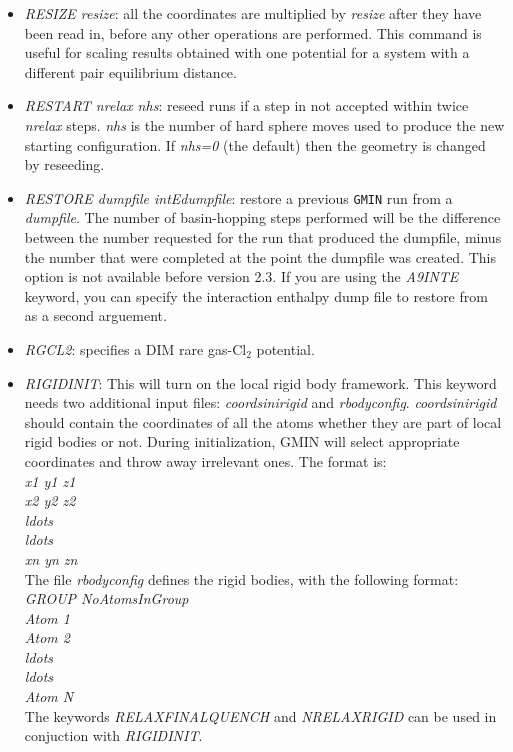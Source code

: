 \documentclass[12pt,a4paper,dvips]{article}
\begin{document}
\begin{itemize}
\item {\it RESIZE resize\/}: all the coordinates are multiplied by {\it resize\/} after
they have been read in, before any other operations are performed. This command is useful
for scaling results obtained with one potential for a system with a different pair
equilibrium distance.

\item {\it RESTART\/ nrelax nhs\/}: reseed runs if a step in not accepted
within twice {\it nrelax} steps.
{\it nhs} is the number of hard sphere moves used to produce the new starting configuration.
If {\it nhs=0} (the default) then the geometry is changed by reseeding.

\item {\it RESTORE\/ dumpfile intEdumpfile\/}: restore a previous {\tt GMIN} run from a {\it dumpfile}.
The number of basin-hopping steps performed will be the difference between the number
requested for the run that produced the dumpfile, minus the number that were completed
at the point the dumpfile was created. This option is not available before version 2.3.
If you are using the {\it A9INTE\/} keyword, you can specify the interaction enthalpy
dump file to restore from as a second arguement.

\item {\it RGCL2\/}: specifies a DIM rare gas-Cl$_2$ potential.

\item {\it RIGIDINIT\/}: This will turn on the local rigid body framework. This keyword needs two additional input files: {\it coordsinirigid\/} and {\it rbodyconfig\/}. {\it coordsinirigid\/} should contain the coordinates of all the atoms whether they are part of local rigid bodies or not. During initialization, GMIN will select appropriate coordinates and throw away irrelevant ones. The format is: \\
{\it x1 y1 z1} \\
{\it x2 y2 z2} \\
{\it ldots} \\
{\it ldots} \\
{\it xn yn zn} \\

The file {\it rbodyconfig\/} defines the rigid bodies, with the following format: \\
{\it GROUP NoAtomsInGroup} \\
{\it Atom 1} \\
{\it Atom 2} \\
{\it ldots} \\
{\it ldots} \\
{\it Atom N} \\
The keywords {\it RELAXFINALQUENCH\/} and {\it NRELAXRIGID\/} can be used in conjuction with {\it RIGIDINIT\/}.


\end{itemize}
\end{document}
